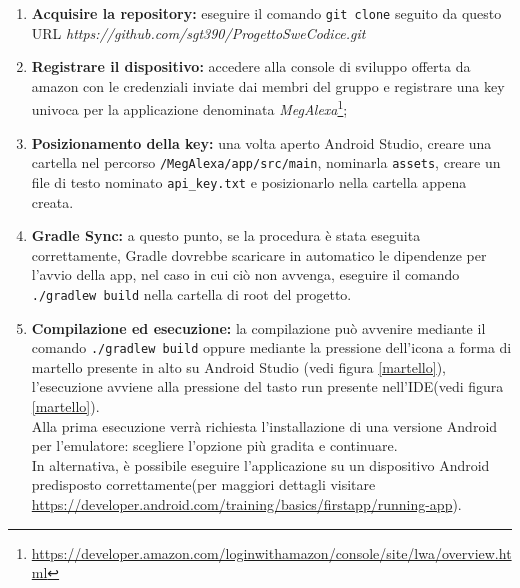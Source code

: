 \begin{enumerate}
	\item \textbf{Acquisire la repository:} eseguire il comando \texttt{git clone} seguito da questo URL \textit{https://github.com/sgt390/ProgettoSweCodice.git}
	\item \textbf{Registrare il dispositivo:} accedere alla console di sviluppo offerta da amazon con le credenziali inviate dai membri del gruppo e registrare una key univoca per la applicazione denominata \textit{MegAlexa}\footnote{\url{https://developer.amazon.com/loginwithamazon/console/site/lwa/overview.html}};
	\item \textbf{Posizionamento della key:} una volta aperto Android Studio, creare una cartella nel percorso \texttt{/MegAlexa/app/src/main}, nominarla \texttt{assets}, creare un file di testo nominato \texttt{api\_key.txt} e posizionarlo nella cartella appena creata.
	\item \textbf{Gradle Sync:} a questo punto, se la procedura è stata eseguita correttamente, Gradle dovrebbe scaricare in automatico le dipendenze per l'avvio della app, nel caso in cui ciò non avvenga, eseguire il comando \texttt{./gradlew build} nella cartella di root del progetto.
	\item\textbf{Compilazione ed esecuzione:} la compilazione può avvenire mediante il comando \texttt{./gradlew build} oppure mediante la pressione dell'icona a forma di martello presente in alto su Android Studio (vedi figura \ref{martello}), l'esecuzione avviene alla pressione del tasto run presente nell'IDE(vedi figura \ref{martello}).\\
	Alla prima esecuzione verrà richiesta l'installazione di una versione Android per l'emulatore: scegliere l'opzione più gradita e continuare.\\
	In alternativa, è possibile eseguire l'applicazione su un dispositivo Android predisposto correttamente(per maggiori dettagli visitare \url{https://developer.android.com/training/basics/firstapp/running-app}). 

	
\end{enumerate}
\label{martello}




